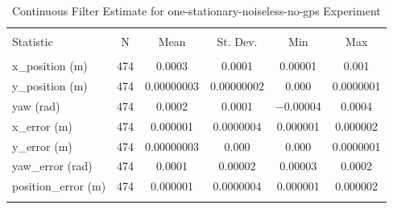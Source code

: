 
\begin{table}[htbp] \centering 
  \caption{Continuous Filter Estimate for one-stationary-noiseless-no-gps Experiment} 
  \label{tab:one_stationary_noiseless_no_gps_continuous_summary} 
\begin{tabular}{@{\extracolsep{5pt}}lccccc} 
\\[-1.8ex]\hline 
\hline \\[-1.8ex] 
Statistic & \multicolumn{1}{c}{N} & \multicolumn{1}{c}{Mean} & \multicolumn{1}{c}{St. Dev.} & \multicolumn{1}{c}{Min} & \multicolumn{1}{c}{Max} \\ 
\hline \\[-1.8ex] 
x\_position (m) & 474 & \num{0.0003} & \num{0.0001} & \num{0.00001} & \num{0.001} \\ 
y\_position (m) & 474 & \num{0.00000003} & \num{0.00000002} & \num{0.000} & \num{0.0000001} \\ 
yaw (rad) & 474 & \num{0.0002} & \num{0.0001} & \num{-0.00004} & \num{0.0004} \\ 
x\_error (m) & 474 & \num{0.000001} & \num{0.0000004} & \num{0.000001} & \num{0.000002} \\ 
y\_error (m) & 474 & \num{0.00000003} & \num{0.000} & \num{0.000} & \num{0.0000001} \\ 
yaw\_error (rad) & 474 & \num{0.0001} & \num{0.00002} & \num{0.00003} & \num{0.0002} \\ 
position\_error (m) & 474 & \num{0.000001} & \num{0.0000004} & \num{0.000001} & \num{0.000002} \\ 
\hline \\[-1.8ex] 
\end{tabular} 
\end{table} 
